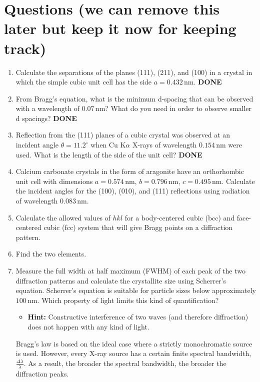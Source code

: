 \section*{Questions (we can remove this later but keep it now for keeping track)}

\begin{enumerate}
    \item Calculate the separations of the planes (111), (211), and (100) in a crystal in which the simple cubic unit cell has the side \( a = 0.432 \, \text{nm} \). \textbf{DONE}
    \item From Bragg’s equation, what is the minimum d-spacing that can be observed with a wavelength of \( 0.07 \, \text{nm} \)? What do you need in order to observe smaller d spacings? \textbf{DONE}
    \item Reflection from the (111) planes of a cubic crystal was observed at an incident angle \( \theta = 11.2^\circ \) when Cu K\(\alpha\) X-rays of wavelength \( 0.154 \, \text{nm} \) were used. What is the length of the side of the unit cell? \textbf{DONE}
    \item Calcium carbonate crystals in the form of aragonite have an orthorhombic unit cell with dimensions \( a = 0.574 \, \text{nm} \), \( b = 0.796 \, \text{nm} \), \( c = 0.495 \, \text{nm} \). Calculate the incident angles for the (100), (010), and (111) reflections using radiation of wavelength \( 0.083 \, \text{nm} \).
    \item Calculate the allowed values of \( hkl \) for a body-centered cubic (bcc) and face-centered cubic (fcc) system that will give Bragg points on a diffraction pattern.
    \item Find the two elements.
    \item Measure the full width at half maximum (FWHM) of each peak of the two diffraction patterns and calculate the crystallite size using Scherrer’s equation. Scherrer’s equation is suitable for particle sizes below approximately \( 100 \, \text{nm} \). Which property of light limits this kind of quantification? 
    \begin{itemize}
        \item \textbf{Hint:} Constructive interference of two waves (and therefore diffraction) does not happen with any kind of light.
    \end{itemize}
    Bragg’s law is based on the ideal case where a strictly monochromatic source is used. However, every X-ray source has a certain finite spectral bandwidth, \( \frac{\Delta \lambda}{\lambda} \). As a result, the broader the spectral bandwidth, the broader the diffraction peaks.
    

\end{enumerate}
